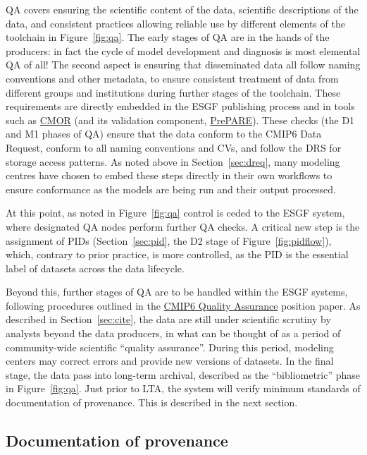 \documentclass[gmd,manuscript]{copernicus}
\newcommand{\figref}[1] {\mbox{Figure   \ref{fig:#1}}}
\newcommand{\secref}[1] {\mbox{Section  \ref{sec:#1}}}
\begin{document}
QA covers ensuring the scientific content of the data, scientific
descriptions of the data, and consistent practices allowing reliable
use by different elements of the toolchain in \figref{qa}. The early
stages of QA are in the hands of the producers: in fact the cycle of
model development and diagnosis is most elemental QA of all! The
second aspect is ensuring that disseminated data all follow naming
conventions and other metadata, to ensure consistent treatment of data
from different groups and institutions during further stages of the
toolchain. These requirements are directly embedded in the ESGF
publishing process and in tools such as
\href{https://cmor.llnl.gov/}{CMOR} (and its validation component,
\href{https://goo.gl/ApvMJx}{PrePARE}). These
checks (the D1 and M1 phases of QA) ensure that the data conform to
the CMIP6 Data Request, conform to all naming conventions and CVs, and
follow the DRS for storage access patterns. As noted above in
\secref{dreq}, many modeling centres have chosen to embed these steps
directly in their own workflows to ensure conformance as the models
are being run and their output processed.

At this point, as noted in \figref{qa} control is ceded to the ESGF
system, where designated QA nodes perform further QA checks. A
critical new step is the assignment of PIDs (\secref{pid}, the D2
stage of \figref{pidflow}), which, contrary to prior practice, is more
controlled, as the PID is the essential label of datasets across the
data lifecycle.

Beyond this, further stages of QA are to be handled within the ESGF
systems, following procedures outlined in the
\href{https://goo.gl/vKmGM4}{CMIP6 Quality Assurance} position paper.
As described in \secref{cite}, the data are still under scientific
scrutiny by analysts beyond the data producers, in what can be thought
of as a period of community-wide scientific ``quality assurance''.
During this period, modeling centers may correct errors and provide new
versions of datasets. In the final stage, the data pass into long-term
archival, described as the ``bibliometric'' phase in \figref{qa}. Just
prior to LTA, the system will verify minimum standards of
documentation of provenance. This is described in the next section.

\subsection{Documentation of provenance}
\label{sec:doc}
\end{document}
